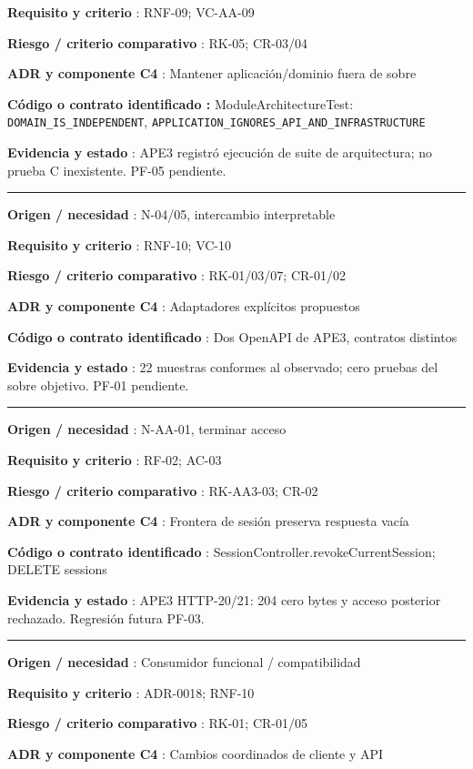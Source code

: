 \documentclass[12pt,a4paper]{report}
\begin{document}
\textbf{Requisito y criterio }: RNF-09; VC-AA-09

\textbf{Riesgo / criterio comparativo }: RK-05; CR-03/04

\textbf{ADR y componente C4 }: Mantener aplicación/dominio fuera de
sobre

\textbf{Código o contrato identificado :} ModuleArchitectureTest: \texttt{DOMAIN\_IS\_INDEPENDENT}, \texttt{APPLICATION\_IGNORES\_API\_AND\_INFRASTRUCTURE}

\textbf{Evidencia y estado }: APE3 registró ejecución de suite de
arquitectura; no prueba C inexistente. PF-05 pendiente.

\medskip\hrule\medskip

\textbf{Origen / necesidad }: N-04/05, intercambio interpretable

\textbf{Requisito y criterio }: RNF-10; VC-10

\textbf{Riesgo / criterio comparativo }: RK-01/03/07; CR-01/02

\textbf{ADR y componente C4 }: Adaptadores explícitos propuestos

\textbf{Código o contrato identificado }: Dos OpenAPI de APE3, contratos
distintos

\textbf{Evidencia y estado }: 22 muestras conformes al observado; cero
pruebas del sobre objetivo. PF-01 pendiente.

\medskip\hrule\medskip

\textbf{Origen / necesidad }: N-AA-01, terminar acceso

\textbf{Requisito y criterio }: RF-02; AC-03

\textbf{Riesgo / criterio comparativo }: RK-AA3-03; CR-02

\textbf{ADR y componente C4 }: Frontera de sesión preserva respuesta
vacía

\textbf{Código o contrato identificado
}: SessionController.revokeCurrentSession; DELETE sessions

\textbf{Evidencia y estado }: APE3 HTTP-20/21: 204 cero bytes y acceso
posterior rechazado. Regresión futura PF-03.

\medskip\hrule\medskip

\textbf{Origen / necesidad }: Consumidor funcional / compatibilidad

\textbf{Requisito y criterio }: ADR-0018; RNF-10

\textbf{Riesgo / criterio comparativo }: RK-01; CR-01/05

\textbf{ADR y componente C4 }: Cambios coordinados de cliente y API
\end{document}
